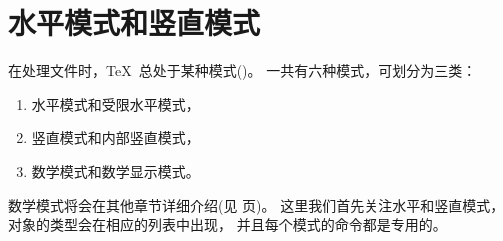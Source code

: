 \documentclass{book}
\begin{document}
\chapter{水平模式和竖直模式}\label{hvmode}
\label{chap:hvmode}

在处理文件时，\TeX\ 总处于某种模式()。
一共有六种模式，可划分为三类：
\begin{enumerate}
\item 水平模式和受限水平模式，
\item 竖直模式和内部竖直模式，
\item 数学模式和数学显示模式。
\end{enumerate}
数学模式将会在其他章节详细介绍(见 \pageref{math:modes} 页)。
这里我们首先关注水平和竖直模式，对象的类型会在相应的列表中出现，
并且每个模式的命令都是专用的。
\end{document}
